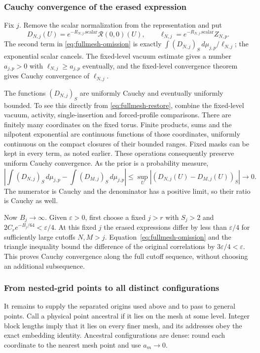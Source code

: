 \subsubsection{Cauchy convergence of the erased expression}
Fix $j$. Remove the scalar normalization from the representation and
put
\[
 D_{N,j}(U)=e^{-R_{N,j}.\mathrm{scalar}}\mathcal R(0,0)(U),
 \qquad
 \ell_{N,j}=e^{-R_{N,j}.\mathrm{scalar}}Z_{N,p}.
\]
The second term in \eqref{eq:fullmesh-omission} is exactly
$\int(D_{N,j})_S\,d\mu_{j,p}/\ell_{N,j}$; the exponential
scalar cancels. The fixed-level vacuum estimate gives a number
$a_{j,p}>0$ with $\ell_{N,j}\ge a_{j,p}$ eventually, and the
fixed-level convergence theorem gives Cauchy convergence of
$\ell_{N,j}$.

The functions $(D_{N,j})_S$ are uniformly Cauchy and eventually
uniformly bounded. To see this directly from
\eqref{eq:fullmesh-restore}, combine the fixed-level vacuum, activity,
single-insertion and forced-profile comparisons. There are finitely
many coordinates on the fixed torus. Finite products, sums and the
nilpotent exponential are continuous functions of those coordinates,
uniformly continuous on the compact closures of their bounded ranges.
Fixed masks can be kept in every term, as noted earlier. These
operations consequently preserve uniform Cauchy convergence.
As the prior is a probability measure,
\[
 \left|\int(D_{N,j})_S\,d\mu_{j,p}
            -\int(D_{M,j})_S\,d\mu_{j,p}\right|
 \le\sup_U|(D_{N,j}(U)-D_{M,j}(U))_S|\longrightarrow0.
\]
The numerator is Cauchy and the denominator has a positive limit,
so their ratio is Cauchy as well.

Now $B_j\to\infty$. Given $\varepsilon>0$, first choose a fixed
$j>r$ with $S_j>2$ and $2C_re^{-B_j/64}<\varepsilon/4$.
At this fixed $j$ the erased expressions differ by less than
$\varepsilon/4$ for sufficiently large cutoffs $N,M>j$.
Equation~\eqref{eq:fullmesh-omission} and the triangle inequality
bound the difference of the original correlations by
$3\varepsilon/4<\varepsilon$. This proves Cauchy convergence along
the full cutoff sequence, without choosing an additional subsequence.

\subsubsection{From nested-grid points to all distinct configurations}
It remains to supply the separated origins used above and to pass
to general points. Call a physical point ancestral if it lies on the
mesh at some level. Integer block lengths imply that it lies on every
finer mesh, and its addresses obey the exact embedding identity.
Ancestral configurations are dense: round each coordinate to the
nearest mesh point and use $a_m\to0$.

